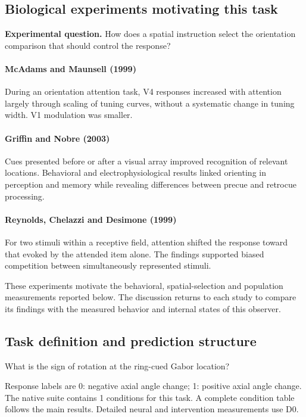 \documentclass[11pt]{article}
\begin{document}
\subsection{Biological experiments motivating this task}
\textbf{Experimental question.} How does a spatial instruction select the orientation comparison that should control the response?

\paragraph{McAdams and Maunsell (1999)} During an orientation attention task, V4 responses increased with attention largely through scaling of tuning curves, without a systematic change in tuning width. V1 modulation was smaller. \cite{bio_mcadams}

\paragraph{Griffin and Nobre (2003)} Cues presented before or after a visual array improved recognition of relevant locations. Behavioral and electrophysiological results linked orienting in perception and memory while revealing differences between precue and retrocue processing. \cite{bio_griffin}

\paragraph{Reynolds, Chelazzi and Desimone (1999)} For two stimuli within a receptive field, attention shifted the response toward that evoked by the attended item alone. The findings supported biased competition between simultaneously represented stimuli. \cite{bio_competition}

These experiments motivate the behavioral, spatial-selection and population measurements reported below. The discussion returns to each study to compare its findings with the measured behavior and internal states of this observer.
\subsection{Task definition and prediction structure}
What is the sign of rotation at the ring-cued Gabor location?

Response labels are 0: negative axial angle change; 1: positive axial angle change. The native suite contains 1 conditions for this task. A complete condition table follows the main results. Detailed neural and intervention measurements use D0.
\end{document}
